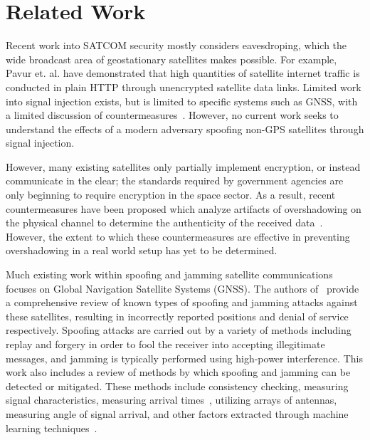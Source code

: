 \section{Related Work}

Recent work into SATCOM security mostly considers eavesdroping, which the wide broadcast area of geostationary satellites makes possible.
For example, Pavur et. al. have demonstrated that high quantities of satellite internet traffic is conducted in plain HTTP through unencrypted satellite data links.  \cite{pavur2020tale}
Limited work into signal injection exists, but is limited to specific systems such as GNSS, with a limited discussion of countermeasures~\cite{tedeschi2022satellite}.
However, no current work seeks to understand the effects of a modern adversary spoofing non-GPS satellites through signal injection.

However, many existing satellites only partially implement encryption, or instead communicate in the clear; the standards required by government agencies are only beginning to require encryption in the space sector.
As a result, recent countermeasures have been proposed which analyze artifacts of overshadowing on the physical channel to determine the authenticity of the received data~\cite{jedermann2021orbit,oligeri2020past}.
However, the extent to which these countermeasures are effective in preventing overshadowing in a real world setup has yet to be determined.


Much existing work within spoofing and jamming satellite communications focuses on Global Navigation Satellite Systems (GNSS).
The authors of~\cite{wuSpoofing2020} provide a comprehensive review of known types of spoofing and jamming attacks against these satellites, resulting in incorrectly reported positions and denial of service respectively.
Spoofing attacks are carried out by a variety of methods including replay and forgery in order to fool the receiver into accepting illegitimate messages, and jamming is typically performed using high-power interference.
This work also includes a review of methods by which spoofing and jamming can be detected or mitigated.
These methods include consistency checking, measuring signal characteristics, measuring arrival times~\cite{jedermann2021orbit}, utilizing arrays of antennas, measuring angle of signal arrival, and other factors extracted through machine learning techniques~\cite{oligeri2020past}.

